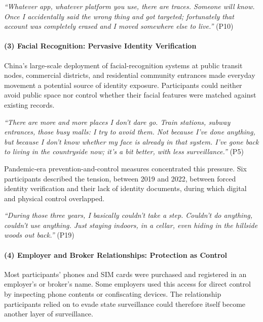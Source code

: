 \documentclass[conference,compsoc]{IEEEtran}
\begin{document}
\begin{displayquote}
\textit{``Whatever app, whatever platform you use, there are traces. Someone will know. Once I accidentally said the wrong thing and got targeted; fortunately that account was completely erased and I moved somewhere else to live.''} (P10)
\end{displayquote}

\paragraph{\textbf{(3) Facial Recognition: Pervasive Identity Verification}}
China's large-scale deployment of facial-recognition systems at public transit nodes, commercial districts, and residential community entrances made everyday movement a potential source of identity exposure. Participants could neither avoid public space nor control whether their facial features were matched against existing records.

\begin{displayquote}
\textit{``There are more and more places I don't dare go. Train stations, subway entrances, those busy malls: I try to avoid them. Not because I've done anything, but because I don't know whether my face is already in that system. I've gone back to living in the countryside now; it's a bit better, with less surveillance.''} (P5)
\end{displayquote}

Pandemic-era prevention-and-control measures concentrated this pressure. Six participants described the tension, between 2019 and 2022, between forced identity verification and their lack of identity documents, during which digital and physical control overlapped.

\begin{displayquote}
\textit{``During those three years, I basically couldn't take a step. Couldn't do anything, couldn't use anything. Just staying indoors, in a cellar, even hiding in the hillside woods out back.''} (P19)
\end{displayquote}

\paragraph{\textbf{(4) Employer and Broker Relationships: Protection as Control}}
Most participants' phones and SIM cards were purchased and registered in an employer's or broker's name. Some employers used this access for direct control by inspecting phone contents or confiscating devices. The relationship participants relied on to evade state surveillance could therefore itself become another layer of surveillance.
\end{document}
